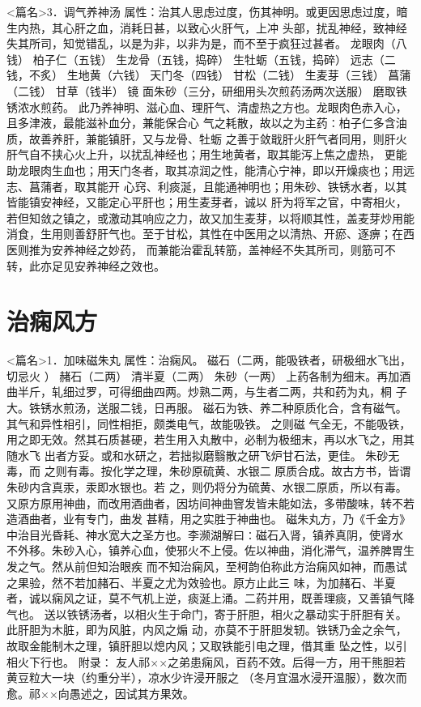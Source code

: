 \documentclass[a4paper,12pt,UTF8,twoside]{ctexbook}
\begin{document}
<篇名>3．调气养神汤
属性：治其人思虑过度，伤其神明。或更因思虑过度，暗生内热，其心肝之血，消耗日甚，以致心火肝气，上冲 
头部，扰乱神经，致神经失其所司，知觉错乱，以是为非，以非为是，而不至于疯狂过甚者。 
龙眼肉（八钱） 柏子仁（五钱） 生龙骨（五钱，捣碎） 生牡蛎（五钱，捣碎） 远志（二钱，不炙） 
生地黄（六钱） 天门冬（四钱） 甘松（二钱） 生麦芽（三钱） 菖蒲（二钱） 甘草（钱半） 镜 
面朱砂（三分，研细用头次煎药汤两次送服） 磨取铁锈浓水煎药。 
此乃养神明、滋心血、理肝气、清虚热之方也。龙眼肉色赤入心，且多津液，最能滋补血分，兼能保合心 
气之耗散，故以之为主药∶柏子仁多含油质，故善养肝，兼能镇肝，又与龙骨、牡蛎 
之善于敛戢肝火肝气者同用，则肝火肝气自不挟心火上升，以扰乱神经也；用生地黄者，取其能泻上焦之虚热， 
更能助龙眼肉生血也；用天门冬者，取其凉润之性，能清心宁神，即以开燥痰也；用远志、菖蒲者，取其能开 
心窍、利痰涎，且能通神明也；用朱砂、铁锈水者，以其皆能镇安神经，又能定心平肝也；用生麦芽者，诚以 
肝为将军之官，中寄相火，若但知敛之镇之，或激动其响应之力，故又加生麦芽，以将顺其性，盖麦芽炒用能 
消食，生用则善舒肝气也。至于甘松，其性在中医用之以清热、开瘀、逐痹；在西医则推为安养神经之妙药， 
而兼能治霍乱转筋，盖神经不失其所司，则筋可不转，此亦足见安养神经之效也。 

\chapter{治痫风方}
<篇名>1．加味磁朱丸
属性：治痫风。 
磁石（二两，能吸铁者，研极细水飞出，切忌火 ） 赭石（二两） 清半夏（二两） 朱砂（一两） 
上药各制为细末。再加酒曲半斤，轧细过罗，可得细曲四两。炒熟二两，与生者二两，共和药为丸，桐 
子大。铁锈水煎汤，送服二钱，日再服。 
磁石为铁、养二种原质化合，含有磁气。其气和异性相引，同性相拒，颇类电气，故能吸铁。 之则磁 
气全无，不能吸铁，用之即无效。然其石质甚硬，若生用入丸散中，必制为极细末，再以水飞之，用其随水飞 
出者方妥。或和水研之，若拙拟磨翳散之研飞炉甘石法，更佳。 
朱砂无毒，而 之则有毒。按化学之理，朱砂原硫黄、水银二 
原质合成。故古方书，皆谓朱砂内含真汞，汞即水银也。若 之，则仍将分为硫黄、水银二原质，所以有毒。 
又原方原用神曲，而改用酒曲者，因坊间神曲窨发皆未能如法，多带酸味，转不若造酒曲者，业有专门，曲发 
甚精，用之实胜于神曲也。 
磁朱丸方，乃《千金方》中治目光昏耗、神水宽大之圣方也。李濒湖解曰∶磁石入肾，镇养真阴，使肾水 
不外移。朱砂入心，镇养心血，使邪火不上侵。佐以神曲，消化滞气，温养脾胃生发之气。然从前但知治眼疾 
而不知治痫风，至柯韵伯称此方治痫风如神，而愚试之果验，然不若加赭石、半夏之尤为效验也。原方止此三 
味，为加赭石、半夏者，诚以痫风之证，莫不气机上逆，痰涎上涌。二药并用，既善理痰，又善镇气降气也。 
送以铁锈汤者，以相火生于命门，寄于肝胆，相火之暴动实于肝胆有关。此肝胆为木脏，即为风脏，内风之煽 
动，亦莫不于肝胆发轫。铁锈乃金之余气，故取金能制木之理，镇肝胆以熄内风；又取铁能引电之理，借其重 
坠之性，以引相火下行也。 
附录∶ 
友人祁××之弟患痫风，百药不效。后得一方，用干熊胆若黄豆粒大一块（约重分半），凉水少许浸开服之 
（冬月宜温水浸开温服），数次而愈。祁××向愚述之，因试其方果效。 
\end{document}
